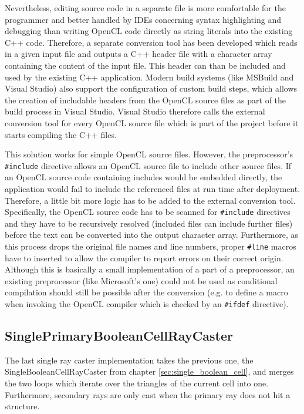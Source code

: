 Nevertheless, editing source code in a separate file is more comfortable for the programmer and better handled by IDEs concerning syntax highlighting and debugging than writing OpenCL code directly as string literals into the existing C++ code. Therefore, a separate conversion tool has been developed which reads in a given input file and outputs a C++ header file with a character array containing the content of the input file. This header can than be included and used by the existing C++ application. Modern build systems (like MSBuild and Visual Studio) also support the configuration of custom build steps, which allows the creation of includable headers from the OpenCL source files as part of the build process in Visual Studio. Visual Studio therefore calls the external conversion tool for every OpenCL source file which is part of the project before it starts compiling the C++ files.

This solution works for simple OpenCL source files. However, the preprocessor's \lstinline!#include! directive allows an OpenCL source file to include other source files. If an OpenCL source code containing includes would be embedded directly, the application would fail to include the referenced files at run time after deployment. Therefore, a little bit more logic has to be added to the external conversion tool. Specifically, the OpenCL source code has to be scanned for \lstinline!#include! directives and they have to be recursively resolved (included files can include further files) before the text can be converted into the output character array. Furthermore, as this process drops the original file names and line numbers, proper \lstinline!#line! macros have to inserted to allow the compiler to report errors on their correct origin. Although this is basically a small implementation of a part of a preprocessor, an existing preprocessor (like Microsoft's one) could not be used as conditional compilation should still be possible after the conversion (e.g. to define a macro when invoking the OpenCL compiler which is checked by an \lstinline!#ifdef! directive).


\subsection{SinglePrimaryBooleanCellRayCaster}
\label{sec:single_primary}

The last single ray caster implementation takes the previous one, the SingleBooleanCellRayCaster from chapter \ref{sec:single_boolean_cell}, and merges the two loops which iterate over the triangles of the current cell into one. Furthermore, secondary rays are only cast when the primary ray does not hit a structure.

